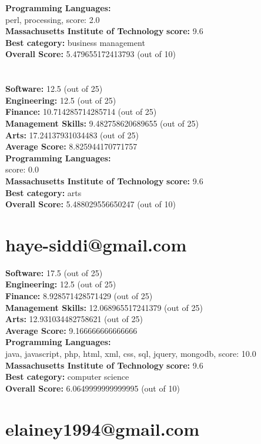 \documentclass{article}
\begin{document}
\textbf{Programming Languages:} \\
perl, processing, score: 2.0\\
\textbf{Massachusetts Institute of Technology} \textbf{score:} 9.6\\
\textbf{Best category: } business management\\
\textbf{Overall Score: }5.479655172413793 (out of 10)\section{}
\textbf{Software:} 12.5 (out of 25)\\
\textbf{Engineering: } 12.5 (out of 25)\\
\textbf{Finance:} 10.714285714285714 (out of 25)\\
\textbf{Management Skills:} 9.482758620689655 (out of 25)\\
\textbf{Arts:} 17.24137931034483 (out of 25)\\
\textbf{Average Score: } 8.825944170771757\\
\textbf{Programming Languages:} \\
score: 0.0\\
\textbf{Massachusetts Institute of Technology} \textbf{score:} 9.6\\
\textbf{Best category: } arts\\
\textbf{Overall Score: }5.488029556650247 (out of 10)\section{haye-siddi@gmail.com}
\textbf{Software:} 17.5 (out of 25)\\
\textbf{Engineering: } 12.5 (out of 25)\\
\textbf{Finance:} 8.928571428571429 (out of 25)\\
\textbf{Management Skills:} 12.068965517241379 (out of 25)\\
\textbf{Arts:} 12.931034482758621 (out of 25)\\
\textbf{Average Score: } 9.166666666666666\\
\textbf{Programming Languages:} \\
java, javascript, php, html, xml, css, sql, jquery, mongodb, score: 10.0\\
\textbf{Massachusetts Institute of Technology} \textbf{score:} 9.6\\
\textbf{Best category: } computer science\\
\textbf{Overall Score: }6.0649999999999995 (out of 10)\section{elainey1994@gmail.com}
\end{document}
